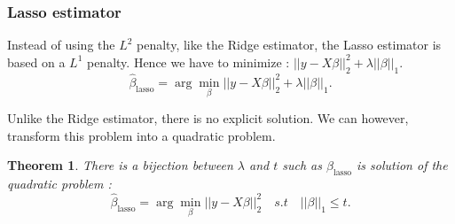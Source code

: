 \documentclass[a4paper,12pt]{article}
\newtheorem*{thm}{Theorem}
\begin{document}
\subsubsection{Lasso estimator}
Instead of using the $L^2$ penalty, like the Ridge estimator, the Lasso estimator is based on a $L^1$ penalty. Hence we have to minimize : $||y - X\beta||_2^2 + \lambda ||\beta||_1$.
\begin{equation}
\hat{\beta}_\text{lasso} = \arg \min_\beta ||y - X\beta||_2^2 + \lambda ||\beta||_1.
\label{DefLagrange}
\end{equation}

Unlike the Ridge estimator, there is no explicit solution. We can however, transform this problem into a quadratic problem.

\begin{thm} There is a bijection between $\lambda$ and $t$ such as ${\beta}_\text{lasso}$ is solution of the quadratic problem : 
\begin{equation}
\hat{\beta}_\text{lasso} = \arg \min_\beta ||y - X\beta||_2^2 \quad s.t \quad ||\beta||_1\leq t.
\label{DefQuadratic}
\end{equation}
\end{thm}
\end{document}
